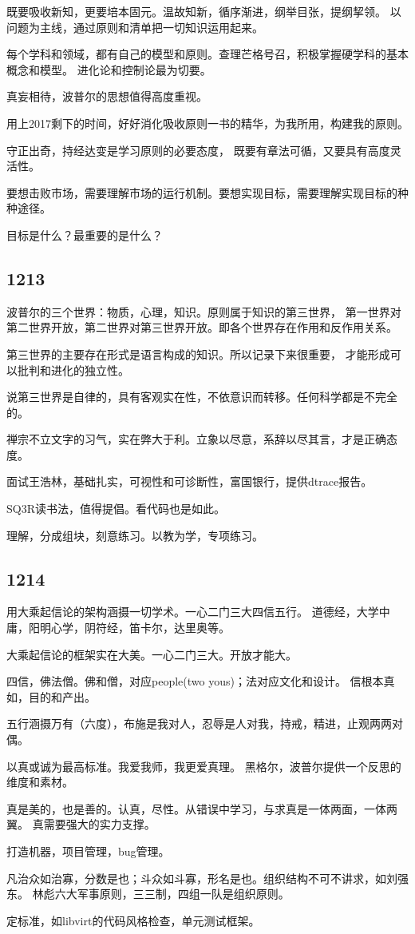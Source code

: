 既要吸收新知，更要培本固元。温故知新，循序渐进，纲举目张，提纲挈领。
以问题为主线，通过原则和清单把一切知识运用起来。

每个学科和领域，都有自己的模型和原则。查理芒格号召，积极掌握硬学科的基本概念和模型。
进化论和控制论最为切要。

真妄相待，波普尔的思想值得高度重视。

用上2017剩下的时间，好好消化吸收原则一书的精华，为我所用，构建我的原则。

守正出奇，持经达变是学习原则的必要态度，
既要有章法可循，又要具有高度灵活性。

要想击败市场，需要理解市场的运行机制。要想实现目标，需要理解实现目标的种种途径。

目标是什么？最重要的是什么？

\subsection{1213}

波普尔的三个世界：物质，心理，知识。原则属于知识的第三世界，
第一世界对第二世界开放，第二世界对第三世界开放。即各个世界存在作用和反作用关系。

第三世界的主要存在形式是语言构成的知识。所以记录下来很重要，
才能形成可以批判和进化的独立性。

说第三世界是自律的，具有客观实在性，不依意识而转移。任何科学都是不完全的。

禅宗不立文字的习气，实在弊大于利。立象以尽意，系辞以尽其言，才是正确态度。

面试王浩林，基础扎实，可视性和可诊断性，富国银行，提供dtrace报告。

SQ3R读书法，值得提倡。看代码也是如此。

理解，分成组块，刻意练习。以教为学，专项练习。

\subsection{1214}

用大乘起信论的架构涵摄一切学术。一心二门三大四信五行。
道德经，大学中庸，阳明心学，阴符经，笛卡尔，达里奥等。

大乘起信论的框架实在大美。一心二门三大。开放才能大。

四信，佛法僧。佛和僧，对应people(two yous)；法对应文化和设计。
信根本真如，目的和产出。

五行涵摄万有（六度），布施是我对人，忍辱是人对我，持戒，精进，止观两两对偶。

以真或诚为最高标准。我爱我师，我更爱真理。
黑格尔，波普尔提供一个反思的维度和素材。

真是美的，也是善的。认真，尽性。从错误中学习，与求真是一体两面，一体两翼。
真需要强大的实力支撑。

打造机器，项目管理，bug管理。

凡治众如治寡，分数是也；斗众如斗寡，形名是也。组织结构不可不讲求，如刘强东。
林彪六大军事原则，三三制，四组一队是组织原则。

定标准，如libvirt的代码风格检查，单元测试框架。
